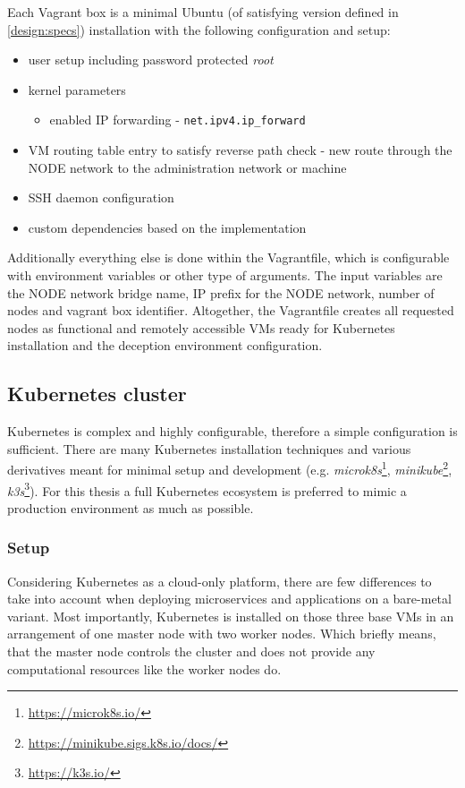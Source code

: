 Each Vagrant box is a minimal Ubuntu (of satisfying version defined in \autoref{design:specs}) installation with the following configuration and setup:
\begin{itemize}
	\item 
	user setup including password protected \textit{root}
	\item 
	kernel parameters
	\begin{itemize}[label=$\hyphen$]
		\item
		enabled IP forwarding - \texttt{net.ipv4.ip\_forward}
	\end{itemize}
	\item 
	VM routing table entry to satisfy reverse path check - new route through the NODE network to the administration network or machine
	\item
	SSH daemon configuration
	\item 
	custom dependencies based on the implementation
\end{itemize}

Additionally everything else is done within the Vagrantfile, which is configurable with environment variables or other type of arguments. The input variables are the NODE network bridge name, IP prefix for the NODE network, number of nodes and vagrant box identifier. Altogether, the Vagrantfile creates all requested nodes as functional and remotely accessible VMs ready for Kubernetes installation and the deception environment configuration.

\subsection{Kubernetes cluster \label{design:env-arch:k8s}}
Kubernetes is complex and highly configurable, therefore a simple configuration is sufficient. There are many Kubernetes installation techniques and various derivatives meant for minimal setup and development (e.g. \textit{microk8s}\footnote{\url{https://microk8s.io/}}, \textit{minikube}\footnote{\url{https://minikube.sigs.k8s.io/docs/}}, \textit{k3s}\footnote{\url{https://k3s.io/}}). For this thesis a full Kubernetes ecosystem is preferred to mimic a production environment as much as possible.

\subsubsection*{Setup \label{design:env-arch:k8s:setup}}
Considering Kubernetes as a cloud-only platform, there are few differences to take into account when deploying microservices and applications on a bare-metal variant. Most importantly, Kubernetes is installed on those three base VMs in an arrangement of one master node with two worker nodes. Which briefly means, that the master node controls the cluster and does not provide any computational resources like the worker nodes do.

